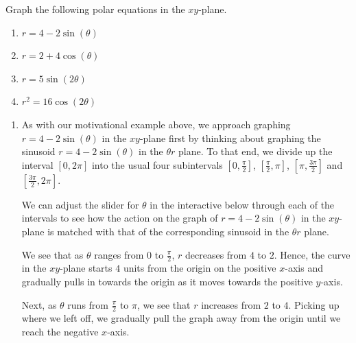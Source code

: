 \documentclass{ximera}
\begin{document}
\begin{example} \label{polargraphex}  Graph the following polar equations in the $xy$-plane.


\begin{enumerate}

\item  \label{limacon01} $r = 4 - 2\sin(\theta)$ 

\item  \label{limacon02} $r = 2 + 4 \cos(\theta)$

\item  \label{rose} $r = 5\sin(2\theta)$

\item  \label{lemniscate} $r^2 = 16 \cos(2\theta)$

\end{enumerate}

\begin{explanation} 

\begin{enumerate}

\item As with our motivational example above, we approach graphing $r = 4 - 2\sin(\theta)$ in the $xy$-plane first by thinking about graphing the sinusoid $r = 4 - 2\sin(\theta)$ in the $\theta r$ plane. To that end, we divide up the interval $[0,2\pi]$ into the usual four subintervals $\left[0, \frac{\pi}{2}\right]$, $\left[\frac{\pi}{2}, \pi\right]$, $\left[\pi, \frac{3\pi}{2}\right]$ and $\left[\frac{3\pi}{2}, 2\pi \right]$.  

We can adjust the slider for $\theta$ in the interactive below through each of the intervals to see how the action on the graph of $r = 4 - 2\sin(\theta)$ in the $xy$-plane is matched with that of the corresponding sinusoid in the $\theta r$ plane.

\begin{center}
\end{center}

We see that as $\theta$ ranges from $0$ to $\frac{\pi}{2}$, $r$ decreases from $4$ to $2$.  Hence, the curve in the $xy$-plane starts $4$ units from the origin on the positive $x$-axis and gradually pulls in towards the origin as it moves towards the positive $y$-axis.

Next, as $\theta$ runs from $\frac{\pi}{2}$ to $\pi$, we see that $r$ increases from $2$ to $4$.  Picking up where we left off, we gradually pull the graph away from the origin until we reach the negative $x$-axis.


\end{enumerate}
\end{explanation}
\end{example}
\end{document}
